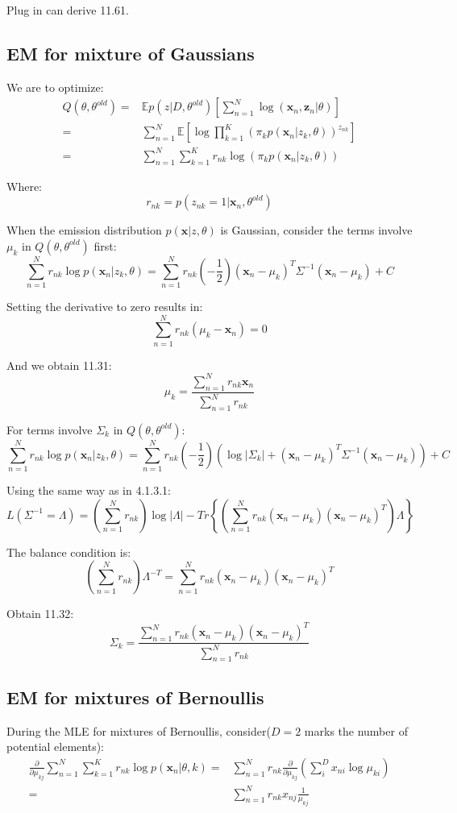 \documentclass[UTF8]{ctexart}
\begin{document}
Plug in can derive 11.61.

\subsection{EM for mixture of Gaussians}
We are to optimize:
\begin{align}
Q(\theta,\theta^{old})=&\mathbb{E}p(z|D,\theta^{old})[\sum_{n=1}^{N}\log (\textbf{x}_{n},\textbf{z}_{n}|\theta)]\nonumber \\
=&\sum_{n=1}^{N}\mathbb{E}[\log \prod_{k=1}^{K}(\pi_{k}p(\textbf{x}_{n}|z_{k},\theta))^{z_{nk}}]\nonumber \\
=&\sum_{n=1}^{N}\sum_{k=1}^{K}r_{nk}\log (\pi_{k}p(\textbf{x}_{n}|z_{k},\theta))\nonumber
\end{align}

Where:
$$r_{nk}=p(z_{nk}=1|\textbf{x}_{n},\theta^{old})$$

When the emission distribution $p(\textbf{x}|z,\theta)$ is Gaussian, consider the terms involve$\mu_{k}$ in $Q(\theta,\theta^{old})$ first:
$$\sum_{n=1}^{N}r_{nk} \log p(\textbf{x}_{n}|z_{k},\theta) = \sum_{n=1}^{N} r_{nk} (-\frac{1}{2})(\textbf{x}_{n}-\mu_{k})^{T}\Sigma^{-1}(\textbf{x}_{n}-\mu_{k}) + C$$

Setting the derivative to zero results in:
$$\sum_{n=1}^{N}r_{nk}(\mu_{k}-\textbf{x}_{n})=0$$

And we obtain 11.31:
$$\mu_{k} =\frac{\sum_{n=1}^{N}r_{nk}\textbf{x}_{n}}{\sum_{n=1}^{N}r_{nk}}$$

For terms involve $\Sigma_{k}$ in $Q(\theta,\theta^{old})$:
$$\sum_{n=1}^{N}r_{nk}\log p(\textbf{x}_{n}|z_{k},\theta) = \sum_{n=1}^{N}r_{nk} (-\frac{1}{2})(\log |\Sigma_{k}|+(\textbf{x}_{n}-\mu_{k})^{T}\Sigma^{-1}(\textbf{x}_{n}-\mu_{k})) + C$$

Using the same way as in 4.1.3.1:
$$L(\Sigma^{-1}=\Lambda)=(\sum_{n=1}^{N}r_{nk})\log |\Lambda|-Tr\left\{ (\sum_{n=1}^{N}r_{nk}(\textbf{x}_{n}-\mu_{k})(\textbf{x}_{n}-\mu_{k})^{T}) \Lambda \right\}$$

The balance condition is:
$$(\sum_{n=1}^{N}r_{nk})\Lambda^{-T}=\sum_{n=1}^{N}r_{nk}(\textbf{x}_{n}-\mu_{k})(\textbf{x}_{n}-\mu_{k})^{T}$$

Obtain 11.32:
$$\Sigma_{k} = \frac{\sum_{n=1}^{N}r_{nk}(\textbf{x}_{n}-\mu_{k})(\textbf{x}_{n}-\mu_{k})^{T}}{\sum_{n=1}^{N}r_{nk}}$$

\subsection{EM for mixtures of Bernoullis}
During the MLE for mixtures of Bernoullis, consider($D=2$ marks the number of  potential elements):
\begin{align}
\frac{\partial}{\partial \mu_{kj}}\sum_{n=1}^{N}\sum_{k=1}^{K}r_{nk}\log p(\textbf{x}_{n}|\theta,k)=&\sum_{n=1}^{N}r_{nk}\frac{\partial}{\partial \mu_{kj}}(\sum_{i}^{D}x_{ni}\log \mu_{ki})\nonumber \\
=&\sum_{n=1}^{N}r_{nk}x_{nj}\frac{1}{\mu_{kj}}\nonumber
\end{align}
\end{document}
